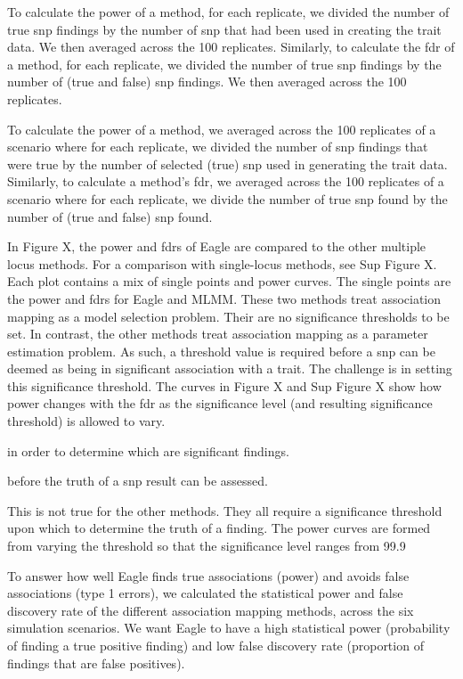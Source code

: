 \documentclass{nature}
\begin{document}
To calculate the power of a method, for each replicate, we divided the number of true snp findings by the number of snp that had been used 
in creating the trait data. We then averaged across the 100 replicates.  Similarly, to calculate the fdr of a method, for each replicate, 
we divided the number of true snp findings by the number of (true and false) snp findings. We then averaged across the 100 replicates.  

 To calculate the power of a method, we averaged across the 100 replicates of a scenario where for each replicate, we divided the number of snp findings that were true by the number of selected (true) 
snp used in generating the trait data.  Similarly, to calculate a method's fdr, we averaged across the 100 replicates of a scenario where 
for each replicate, we divide the number of true snp found by the number of (true and false) snp found.  

In Figure X, the power and fdrs of Eagle are compared to the other multiple locus methods. For a comparison with single-locus methods, 
see Sup Figure X. Each plot contains a mix of single points and power curves. The single points are the power and fdrs for Eagle and MLMM. 
These two methods treat association mapping as a model selection problem. Their are no significance thresholds to be set. 
In contrast, the other methods treat association mapping as a parameter estimation problem. As such, a threshold value is required before a snp 
can be deemed as being in significant association with a trait.  The challenge is in setting this significance threshold. The curves in Figure 
X and Sup Figure X  show how power changes with the fdr as the significance level (and resulting significance threshold) is allowed to vary. 






 in order to determine which are significant findings. 


before the truth of a snp result can be assessed.  


This is not true for the other methods. They all require a significance threshold upon which to determine the truth of a finding. The power curves are formed from varying the threshold so that the significance level ranges from 99.9%









To answer how well Eagle finds true associations (power) and avoids 
false associations (type 1 errors), we calculated the statistical power and false discovery rate of the different 
association mapping methods, across the six simulation scenarios.  We want Eagle to have a high statistical power 
(probability of finding a true positive finding) and low false discovery rate (proportion of findings that are false positives). 
\end{document}
